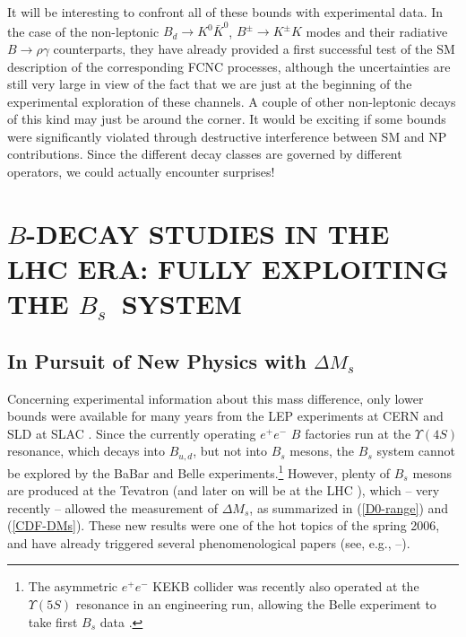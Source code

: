 \documentclass[11pt]{cernrep}
\begin{document}
It will be interesting to confront all of these bounds with experimental data.
In the case of the non-leptonic $B_d\to K^0\bar K^0$, $B^\pm\to K^\pm K$ modes
and their radiative $B\to\rho \gamma$ counterparts, they have already provided a
first successful test of the SM description of the corresponding FCNC processes,
although the uncertainties are still very large in view of the fact that 
we are just at the beginning
of the experimental exploration of these channels. A couple of other non-leptonic
decays of this kind may just be around the corner. It would be exciting if some
bounds were significantly violated through destructive interference between
SM and NP contributions. Since the different decay classes are governed by
different operators, we could actually encounter surprises!



%
%
%
\section{\boldmath$B$\unboldmath-DECAY STUDIES IN THE LHC ERA: FULLY 
EXPLOITING THE \boldmath$B_s$\unboldmath~SYSTEM}\label{sec:LHC}
\setcounter{equation}{0}
%
%
%
\boldmath
\subsection{In Pursuit of New Physics with 
$\Delta M_s$}\label{ssec:Bs-prelim}
\unboldmath
%
%
%
Concerning experimental information about this mass difference, only lower 
bounds were available for many years from the LEP experiments at CERN 
and SLD at SLAC \cite{LEPBOSC}. Since the currently operating $e^+e^-$ $B$ 
factories run at the $\Upsilon(4S)$ resonance, which decays into $B_{u,d}$, 
but not into $B_s$ mesons, the $B_s$ system cannot be explored by the BaBar 
and Belle experiments.\footnote{The asymmetric $e^+e^-$ KEKB collider was 
recently also operated at the $\Upsilon(5S)$ resonance in an engineering run, 
allowing the Belle experiment to take first $B_s$ data \cite{Belle-Y5S}.} 
However, plenty of $B_s$ mesons are produced at 
the Tevatron (and later on will be at the LHC \cite{schneider}), which --
very recently -- allowed the measurement of $\Delta M_s$,
as summarized  in (\ref{D0-range}) and (\ref{CDF-DMs}). 
These new results were one of the hot topics of the spring 2006, and
have already triggered several phenomenological papers 
(see, e.g., \cite{CMNSW}--\cite{GNR}).
\end{document}
